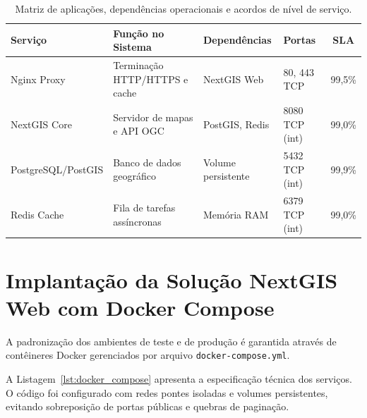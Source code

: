 \begin{table}[htbp]
\centering
\small
\caption{Matriz de aplicações, dependências operacionais e acordos de nível de serviço.}
\label{tab:aplicacoes_dependencias}
\begin{tabularx}{\textwidth}{|l|Y|l|l|c|}
\hline
{}
\textbf{Serviço} & \textbf{Função no Sistema} & \textbf{Dependências} & \textbf{Portas} & \textbf{SLA} \\ \hline
Nginx Proxy & Terminação HTTP/HTTPS e cache & NextGIS Web & 80, 443 TCP & 99,5\% \\ \hline
NextGIS Core & Servidor de mapas e API OGC & PostGIS, Redis & 8080 TCP (int) & 99,0\% \\ \hline
PostgreSQL/PostGIS & Banco de dados geográfico & Volume persistente & 5432 TCP (int) & 99,9\% \\ \hline
Redis Cache & Fila de tarefas assíncronas & Memória RAM & 6379 TCP (int) & 99,0\% \\ \hline
\end{tabularx}
\end{table}

\section{Implantação da Solução NextGIS Web com Docker Compose}

A padronização dos ambientes de teste e de produção é garantida através de contêineres Docker gerenciados por arquivo \texttt{docker-compose.yml}.

A Listagem~\ref{lst:docker_compose} apresenta a especificação técnica dos serviços. O código foi configurado com redes pontes isoladas e volumes persistentes, evitando sobreposição de portas públicas e quebras de paginação.

